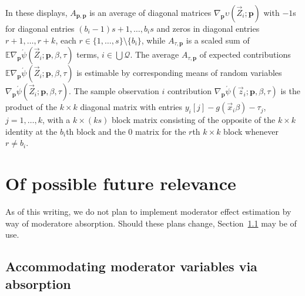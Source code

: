\documentclass{article}
\newcommand{\absorbInterceptsEF}{\upsilon}
\begin{document}
In these displays, $A_{\mathbf{p}, \mathbf{p}}$ is
an average of diagonal matrices $\nabla_{\mathbf{p}}\absorbInterceptsEF(\vec{Z}_{i};
\mathbf{p})$ with $-1$s for diagonal entries $(b_{i}-1)s+1, \ldots,
b_{i}s$ and zeros in diagonal entries $r+1, \ldots, r+k$, each
$r \in \{1, \ldots, s\}\setminus \{b_{i}\}$, while $A_{\tau,
  \mathbf{p}}$ is a scaled sum of $\mathbb{E} \nabla_{\mathbf{p}}\acute{\psi}(\vec{Z}_{i};
\mathbf{p}, \beta, \tau)$ terms, $i \in \bigcup \mathcal{Q}$. The average $A_{\tau,
  \mathbf{p}}$ of expected contributions $\mathbb{E} \nabla_{\mathbf{p}}\acute{\psi}(\vec{Z}_{i};
\mathbf{p}, \beta, \tau)$ is estimable by corresponding means of
random variables $\nabla_{\mathbf{p}}\acute{\psi}(\vec{Z}_{i};
\mathbf{p}, \beta, \tau)$.  The sample observation $i$ contribution $\nabla_{\mathbf{p}}\acute{\psi}(\vec{z}_{i};
\mathbf{p}, \beta, \tau)$ is the product of the $k \times k$
diagonal matrix with entries $y_{i}[j] - g(\vec{x}_{i}\beta) -
\tau_{j}$, $j=1, \ldots, k$, with a $k \times (ks)$ block matrix
consisting of the opposite of the $k\times k$ identity at the
$b_{i}$th block and the 0 matrix for the $r$th $k \times k$ block whenever
$r\neq b_{i}$.

\section{Of possible future relevance}

As of this writing, we do not plan to implement moderator effect estimation by way of moderatore absorption.  Should these plans change, Section~\ref{sec:accomm-moder-vari} may be of use.
\subsection{Accommodating moderator variables via absorption}
\label{sec:accomm-moder-vari}
\end{document}

